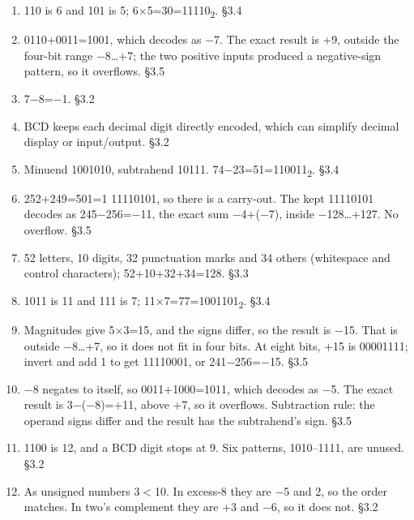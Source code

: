 \documentclass[11pt]{article}
\begin{document}
\begin{keepsection}
\begin{enumerate}
\item 110 is 6 and 101 is 5; 6\ensuremath{\times}5=30=11110\textsubscript{2}. \hfill{\small\color{FAUblue}§3.4}
\item 0110+0011=1001, which decodes as \ensuremath{-}7. The exact result is +9, outside the four-bit range \ensuremath{-}8…+7; the two positive inputs produced a negative-sign pattern, so it overflows. \hfill{\small\color{FAUblue}§3.5}
\item 7\ensuremath{-}8=\ensuremath{-}1. \hfill{\small\color{FAUblue}§3.2}
\item BCD keeps each decimal digit directly encoded, which can simplify decimal display or input/output. \hfill{\small\color{FAUblue}§3.2}
\item Minuend 1001010, subtrahend 10111. 74\ensuremath{-}23=51=110011\textsubscript{2}. \hfill{\small\color{FAUblue}§3.4}
\item 252+249=501=1 11110101, so there is a carry-out. The kept 11110101 decodes as 245\ensuremath{-}256=\ensuremath{-}11, the exact sum \ensuremath{-}4+(\ensuremath{-}7), inside \ensuremath{-}128…+127. No overflow. \hfill{\small\color{FAUblue}§3.5}
\item 52 letters, 10 digits, 32 punctuation marks and 34 others (whitespace and control characters); 52+10+32+34=128. \hfill{\small\color{FAUblue}§3.3}
\item 1011 is 11 and 111 is 7; 11\ensuremath{\times}7=77=1001101\textsubscript{2}. \hfill{\small\color{FAUblue}§3.4}
\item Magnitudes give 5\ensuremath{\times}3=15, and the signs differ, so the result is \ensuremath{-}15. That is outside \ensuremath{-}8…+7, so it does not fit in four bits. At eight bits, +15 is 00001111; invert and add 1 to get 11110001, or 241\ensuremath{-}256=\ensuremath{-}15. \hfill{\small\color{FAUblue}§3.5}
\item \ensuremath{-}8 negates to itself, so 0011+1000=1011, which decodes as \ensuremath{-}5. The exact result is 3\ensuremath{-}(\ensuremath{-}8)=+11, above +7, so it overflows. Subtraction rule: the operand signs differ and the result has the subtrahend’s sign. \hfill{\small\color{FAUblue}§3.5}
\item 1100 is 12, and a BCD digit stops at 9. Six patterns, 1010–1111, are unused. \hfill{\small\color{FAUblue}§3.2}
\item As unsigned numbers 3\ensuremath{<}10. In excess-8 they are \ensuremath{-}5 and 2, so the order matches. In two’s complement they are +3 and \ensuremath{-}6, so it does not. \hfill{\small\color{FAUblue}§3.2}
\end{enumerate}

\end{keepsection}
\end{document}
